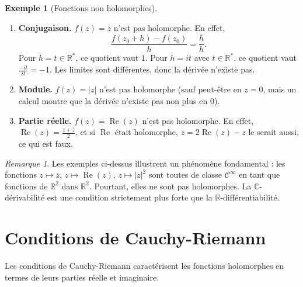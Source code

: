 \documentclass[12pt,a4paper,openany]{book}
\theoremstyle{definition}
\newtheorem{exemple}[definition]{Exemple}
\theoremstyle{plain}
\theoremstyle{remark}
\newtheorem{remarque}[definition]{Remarque}
\newcommand{\C}{\mathbb{C}}
\newcommand{\R}{\mathbb{R}}
\DeclareMathOperator{\re}{Re}
\newcommand{\abs}[1]{\left|#1\right|}
\newcommand{\conj}[1]{\overline{#1}}
\begin{document}
\begin{exemple}[Fonctions non holomorphes]\label{ex:non-holomorphes}
\begin{enumerate}[label=(\roman*)]
  \item \textbf{Conjugaison.} $f(z) = \conj{z}$ n'est pas holomorphe. En effet,
  \[
    \frac{f(z_0+h)-f(z_0)}{h} = \frac{\conj{h}}{h}.
  \]
  Pour $h = t \in \R^*$, ce quotient vaut $1$. Pour $h = it$ avec $t \in \R^*$, ce quotient vaut $\frac{-it}{it} = -1$. Les limites sont différentes, donc la dérivée n'existe pas.

  \item \textbf{Module.} $f(z) = \abs{z}$ n'est pas holomorphe (sauf peut-être en $z = 0$, mais un calcul montre que la dérivée n'existe pas non plus en $0$).

  \item \textbf{Partie réelle.} $f(z) = \re(z)$ n'est pas holomorphe. En effet, $\re(z) = \frac{z + \conj{z}}{2}$, et si $\re$ était holomorphe, $\conj{z} = 2\re(z) - z$ le serait aussi, ce qui est faux.
\end{enumerate}
\end{exemple}

\begin{remarque}\label{rem:holomorphe-vs-derivable}
Les exemples ci-dessus illustrent un phénomène fondamental : les fonctions $z \mapsto \conj{z}$, $z \mapsto \re(z)$, $z \mapsto \abs{z}^2$ sont toutes de classe $\mathscr{C}^\infty$ en tant que fonctions de $\R^2$ dans $\R^2$. Pourtant, elles ne sont pas holomorphes. La $\C$-dérivabilité est une condition strictement plus forte que la $\R$-différentiabilité.
\end{remarque}

\section{Conditions de Cauchy-Riemann}\label{sec:cauchy-riemann}

Les conditions de Cauchy-Riemann caractérisent les fonctions holomorphes en termes de leurs parties réelle et imaginaire.
\end{document}
